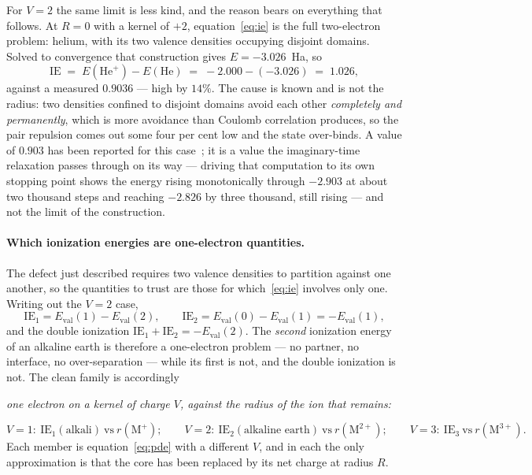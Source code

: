 \documentclass[11pt]{article}
\begin{document}
For $V=2$ the same limit is less kind, and the reason bears on everything that follows. At
$R=0$ with a kernel of $+2$, equation~\eqref{eq:ie} is the full two-electron problem: helium,
with its two valence densities occupying disjoint domains. Solved to convergence that
construction gives $E=-3.026$~Ha, so
\[
\mathrm{IE} \;=\; E(\mathrm{He}^+)-E(\mathrm{He}) \;=\; -2.000-(-3.026) \;=\; 1.026,
\]
against a measured $0.9036$ --- high by $14\%$. The cause is known and is not the radius: two
densities confined to disjoint domains avoid each other \emph{completely and permanently},
which is more avoidance than Coulomb correlation produces, so the pair repulsion comes out
some four per cent low and the state over-binds. A value of $0.903$ has been reported for this
case~\cite{Johnson-blogAE}; it is a value the imaginary-time relaxation passes through on its
way --- driving that computation to its own stopping point shows the energy rising
monotonically through $-2.903$ at about two thousand steps and reaching $-2.826$ by three
thousand, still rising --- and not the limit of the construction.

\paragraph{Which ionization energies are one-electron quantities.} The defect just described
requires two valence densities to partition against one another, so the quantities to trust are
those for which~\eqref{eq:ie} involves only one. Writing out the $V=2$ case,
\[
\mathrm{IE}_1 = E_{\mathrm{val}}(1)-E_{\mathrm{val}}(2), \qquad
\mathrm{IE}_2 = E_{\mathrm{val}}(0)-E_{\mathrm{val}}(1) = -E_{\mathrm{val}}(1),
\]
and the double ionization $\mathrm{IE}_1+\mathrm{IE}_2 = -E_{\mathrm{val}}(2)$. The
\emph{second} ionization energy of an alkaline earth is therefore a one-electron problem ---
no partner, no interface, no over-separation --- while its first is not, and the double
ionization is not. The clean family is accordingly
\begin{center}
\emph{one electron on a kernel of charge $V$, against the radius of the ion that remains:}
\end{center}
\[
V=1:\ \mathrm{IE}_1(\text{alkali}) \ \text{vs}\ r(\mathrm{M^+}); \qquad
V=2:\ \mathrm{IE}_2(\text{alkaline earth}) \ \text{vs}\ r(\mathrm{M^{2+}}); \qquad
V=3:\ \mathrm{IE}_3 \ \text{vs}\ r(\mathrm{M^{3+}}).
\]
Each member is equation~\eqref{eq:pde} with a different $V$, and in each the only approximation
is that the core has been replaced by its net charge at radius $R$.
\end{document}

